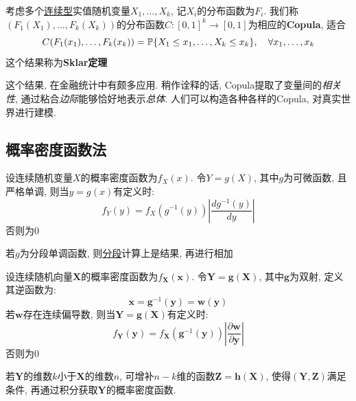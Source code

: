 \begin{theorem}[Sklar定理]
    考虑多个\underline{连续型}实值随机变量$X_{1},\dots,X_{k}$, 记$X_{i}$的分布函数为$F_{i}$. 我们称$(F_{1}(X_{1}),\dots,F_{k}(X_{k}))$的分布函数$C : [0,1]^{k} \to [0,1]$为相应的\textbf{Copula}, 适合
    \[ C(F_{1}(x_{1}),\dots,F_{k}(x_{k})) = \P\{X_{1}\le x_{1},\dots,X_{k}\le x_{k}\}, \quad \forall x_{1},\dots,x_{k} \]
    这个结果称为\textbf{Sklar定理}
\end{theorem}


这个结果, 在金融统计中有颇多应用. 稍作诠释的话, Copula提取了变量间的\emph{相关性}, 通过粘合\emph{边际}能够恰好地表示\emph{总体}.
人们可以构造各种各样的Copula, 对真实世界进行建模.

\subsection{概率密度函数法}

\begin{theorem}
    设连续随机变量$X$的概率密度函数为$f_X(x)$. 令$Y=g(X)$, 其中$g$为可微函数, 且严格单调, 则当$y=g(x)$有定义时:
    \[ f_Y(y)=f_X(g^{-1}(y))\left| \frac{dg^{-1}(y)}{dy} \right|  \]
    否则为$0$

    若$g$为分段单调函数, 则\underline{分段}计算上是结果, 再进行相加
\end{theorem}

\begin{theorem}
    设连续随机向量$\mathbf{X}$的概率密度函数为$f_\mathbf{X}(\mathbf{x})$. 令$\mathbf{Y}=\mathbf{g}(\mathbf{X})$, 其中$\mathbf{g}$为双射, 定义其逆函数为:
    \[ \mathbf{x}=\mathbf{g}^{-1}(\mathbf{y})=\mathbf{w}(\mathbf{y}) \]
    若$\mathbf{w}$存在连续偏导数, 则当$\mathbf{Y}=\mathbf{g}(\mathbf{X})$有定义时:
    \[ f_\mathbf{Y}(\mathbf{y})=f_\mathbf{X}(\mathbf{g}^{-1}(\mathbf{y}))\left| \frac{\partial \mathbf{w}}{\partial \mathbf{y}} \right|  \]
    否则为$0$
\end{theorem}

\begin{remark}
    若$\mathbf{Y}$的维数$k$小于$\mathbf{X}$的维数$n$, 可增补$n-k$维的函数$\mathbf{Z}=\mathbf{h}(\mathbf{X})$, 使得$(\mathbf{Y},\mathbf{Z})$满足条件, 再通过积分获取$\mathbf{Y}$的概率密度函数.
\end{remark}


